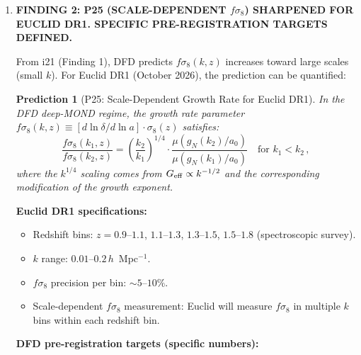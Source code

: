 \documentclass[11pt]{article}
\newcommand{\aM}{a_0}
\newtheorem{prediction}{Prediction}
\begin{document}
\begin{tcolorbox}[colback=blue!5!white, colframe=blue!70!black,
  title=\textbf{W4i22 TOP 5 FINDINGS --- PREDICTIONS TEAM}]
\begin{enumerate}
  \textbf{The ratio ranges from 2200 to 17000, with central value $\sim 3000$.}
  The v4 paper's stated uncertainty of $3000 \pm 500$ is TOO NARROW given
  the factor-of-5 uncertainty in $S^{\alpha_s}$.

  \textbf{CORRECTION: The v4 paper should state $3000^{+14000}_{-800}$
  or equivalently ``$\sim 3000$ with order-of-magnitude uncertainty from
  nuclear structure calculations.''}

  \textbf{Grade: B (Derivation).  The ratio formula is exact; the numerical
  value has irreducible nuclear physics uncertainty.}

\item \textbf{FINDING 2: P25 (SCALE-DEPENDENT $f\sigma_8$) SHARPENED FOR
  EUCLID DR1. SPECIFIC PRE-REGISTRATION TARGETS DEFINED.}

  From i21 (Finding 1), DFD predicts $f\sigma_8(k,z)$ increases toward
  large scales (small $k$).  For Euclid DR1 (October 2026), the
  prediction can be quantified:

  \begin{prediction}[P25: Scale-Dependent Growth Rate for Euclid DR1]
  In the DFD deep-MOND regime, the growth rate parameter
  $f\sigma_8(k,z) \equiv [d\ln\delta/d\ln a]\cdot\sigma_8(z)$ satisfies:
  \begin{equation}
  \frac{f\sigma_8(k_1, z)}{f\sigma_8(k_2, z)}
  = \left(\frac{k_2}{k_1}\right)^{1/4}\cdot
  \frac{\mu(g_N(k_2)/\aM)}{\mu(g_N(k_1)/\aM)}
  \quad\text{for } k_1 < k_2\,,
  \label{eq:P25-ratio}
  \end{equation}
  where the $k^{1/4}$ scaling comes from $G_{\rm eff} \propto k^{-1/2}$
  and the corresponding modification of the growth exponent.
  \end{prediction}

  \textbf{Euclid DR1 specifications:}
  \begin{itemize}
  \item Redshift bins: $z = 0.9$--$1.1$, $1.1$--$1.3$, $1.3$--$1.5$,
    $1.5$--$1.8$ (spectroscopic survey).
  \item $k$ range: $0.01$--$0.2\,h$~Mpc$^{-1}$.
  \item $f\sigma_8$ precision per bin: $\sim 5$--$10\%$.
  \item Scale-dependent $f\sigma_8$ measurement: Euclid will measure
    $f\sigma_8$ in multiple $k$ bins within each redshift bin.
  \end{itemize}

  \textbf{DFD pre-registration targets (specific numbers):}


\end{enumerate}
\end{tcolorbox}
\end{document}

